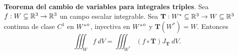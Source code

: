 \begin{theorem}
    \textbf{Teorema del cambio de variables para integrales triples}. Sea $f:W\subseteq\mathbb{R}^3\to\mathbb{R}^3$ un campo escalar integrable. Sea $\mathbf{T}:W^*\subseteq\mathbb{R}^3\to W\subseteq\mathbb{R}^3$ continua de clase $C^1$ en ${\kern0ptW^*}^{\mathrm{o}}$, inyectiva en ${\kern0ptW^*}^{\mathrm{o}}$ y $\mathbf{T}(W^*)=W$. Entonces
    \[
        \iiint_W f\:dV=\iiint_{W^*}(f\circ\mathbf{T})J_\mathbf{T}\:dV.
    \]
\end{theorem}
